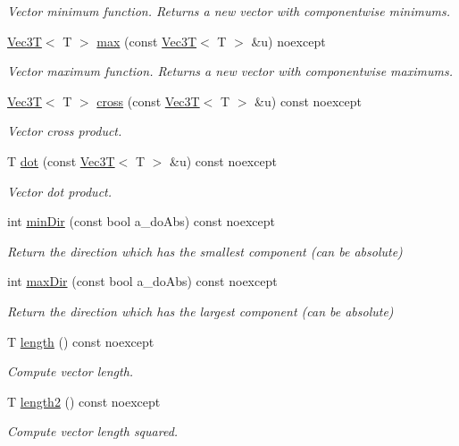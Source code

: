 \begin{DoxyCompactItemize}
\begin{DoxyCompactList}\small\item\em Vector minimum function. Returns a new vector with componentwise minimums. \end{DoxyCompactList}\item 
\hyperlink{classVec3T}{Vec3T}$<$ T $>$ \hyperlink{classVec3T_ac126bbdaeff79e475327887bfa8aa62c}{max} (const \hyperlink{classVec3T}{Vec3T}$<$ T $>$ \&u) noexcept
\begin{DoxyCompactList}\small\item\em Vector maximum function. Returns a new vector with componentwise maximums. \end{DoxyCompactList}\item 
\hyperlink{classVec3T}{Vec3T}$<$ T $>$ \hyperlink{classVec3T_af628d2d42a93200a929bd54a1fe8353f}{cross} (const \hyperlink{classVec3T}{Vec3T}$<$ T $>$ \&u) const noexcept
\begin{DoxyCompactList}\small\item\em Vector cross product. \end{DoxyCompactList}\item 
T \hyperlink{classVec3T_ab4bebdfbdc863826a1a7e86cad130ff8}{dot} (const \hyperlink{classVec3T}{Vec3T}$<$ T $>$ \&u) const noexcept
\begin{DoxyCompactList}\small\item\em Vector dot product. \end{DoxyCompactList}\item 
int \hyperlink{classVec3T_add4db9b06b01f85ce492742acae86545}{min\+Dir} (const bool a\+\_\+do\+Abs) const noexcept
\begin{DoxyCompactList}\small\item\em Return the direction which has the smallest component (can be absolute) \end{DoxyCompactList}\item 
int \hyperlink{classVec3T_a292391c1f72ca66e100e7e70512ff9b1}{max\+Dir} (const bool a\+\_\+do\+Abs) const noexcept
\begin{DoxyCompactList}\small\item\em Return the direction which has the largest component (can be absolute) \end{DoxyCompactList}\item 
T \hyperlink{classVec3T_a93c868b181e24a4f74702a8b8a36f815}{length} () const noexcept
\begin{DoxyCompactList}\small\item\em Compute vector length. \end{DoxyCompactList}\item 
T \hyperlink{classVec3T_aaed89aee434cfa0abd86fe33bff49b4e}{length2} () const noexcept
\begin{DoxyCompactList}\small\item\em Compute vector length squared. \end{DoxyCompactList}\end{DoxyCompactItemize}
